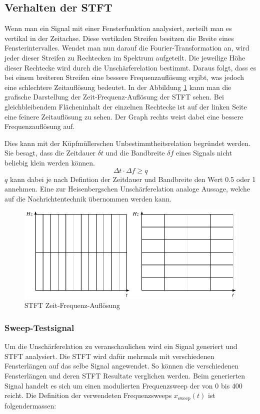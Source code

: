 \subsection{Verhalten der STFT}

Wenn man ein Signal mit einer Fensterfunktion analysiert, zerteilt man es vertikal in der Zeitachse. Diese vertikalen Streifen besitzen die Breite eines Fensterintervalles. Wendet man nun darauf die Fourier-Transformation an, wird jeder dieser Streifen zu Rechtecken im Spektrum aufgeteilt. Die jeweilige Höhe dieser Rechtecke wird durch die Unschärferelation bestimmt. Daraus folgt, dass es bei einem breiteren Streifen eine bessere Frequenzauflösung ergibt, was jedoch eine schlechtere Zeitauflösung bedeutet. In der Abbildung \ref{fig:stftauf} kann man die grafische Darstellung der Zeit-Frequenz-Auflösung der STFT sehen. Bei gleichbleibendem Flächeninhalt der einzelnen Rechtecke ist auf der linken Seite eine feinere Zeitauflösung zu sehen. Der Graph rechts weist dabei eine bessere Frequenzauflösung auf. 

Dies kann mit der Küpfmüllerschen Unbestimmtheitsrelation begründet werden. Sie besagt, dass die Zeitdauer $\delta t$ und die Bandbreite $\delta f$ eines Signals nicht beliebig klein werden können.  
\[\Delta t \cdot \Delta f \geq q\]
$q$ kann dabei je nach Defintion der Zeitdauer und Bandbreite den Wert 0.5 oder 1 annehmen. Eine zur Heisenbergschen Unschärferelation analoge Aussage, welche auf die Nachrichtentechnik übernommen werden kann.


\begin{figure}[!ht]
	\centering
	\includegraphics[width=0.9\linewidth]{papers/autotune/sections/fft/images/windows.pdf}
	\caption{STFT Zeit-Frequenz-Auflösung}\label{fig:stftauf}	
\end{figure}



\subsubsection{Sweep-Testsignal}
Um die Unschärferelation zu veranschaulichen wird ein Signal generiert und STFT analysiert. Die STFT wird dafür mehrmals mit verschiedenen Fensterlängen auf das selbe Signal angewendet. So können die verschiedenen Fensterlängen und deren STFT Resultate verglichen werden. Beim generierten Signal handelt es sich um einen modulierten Frequenzsweep der von 0 bis 400\text{[Hz]} reicht. Die Definition der verwendeten Frequenzsweeps $x_{\text{sweep}}(t)$ ist folgendermassen:

